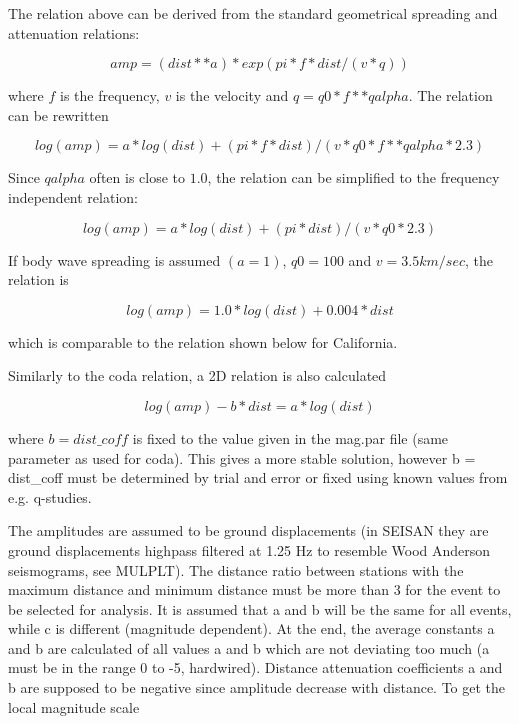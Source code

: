 The relation above can be derived from the standard geometrical spreading and attenuation relations: 

\begin{displaymath}
amp = (dist ** a) * exp(pi * f * dist/(v*q )) 
\end{displaymath}

where $f$ is the frequency, $v$ is the velocity and $q = q0*f**qalpha$. The relation can be rewritten 

\begin{displaymath}
log(amp) = a * log(dist) + (pi * f * dist) /(v * q0*f**qalpha * 2.3) 
\end{displaymath}

Since $qalpha$ often is close to $1.0$, the relation can be simplified to the frequency independent relation:

\begin{displaymath}
log(amp) = a * log(dist) + (pi * dist) /(v * q0 * 2.3) 
\end{displaymath}

If body wave spreading is assumed $(a=1)$, $q0=100$ and $v=3.5 km/sec$, the relation is 

\begin{displaymath}
log(amp) = 1.0 * log(dist) + 0.004 * dist 
\end{displaymath}

which is comparable to the relation shown below for California. 

Similarly to the coda relation, a 2D relation is also calculated 

\begin{displaymath}
log(amp) - b*dist = a * log(dist) 
\end{displaymath}

where $b=dist\_coff$ is fixed to the value given in the mag.par file (same parameter as used for coda). This gives a more stable solution, however b = dist\_coff must be determined by trial and error or fixed using known values from e.g. q-studies. 

The amplitudes are assumed to be ground displacements (in SEISAN they are ground displacements highpass filtered at 1.25 Hz to resemble Wood Anderson seismograms, see MULPLT). The distance ratio between stations with the maximum distance and minimum distance must be more than 3 for the event to be selected for analysis. It is assumed that a and b will be the same for all events, while c is different (magnitude dependent). At the end, the average constants a and b are calculated of all values a and b which are not deviating too much (a must be in the range 0 to -5, hardwired). Distance attenuation coefficients a and b are supposed to be negative since amplitude decrease with distance. To get the local magnitude scale 


